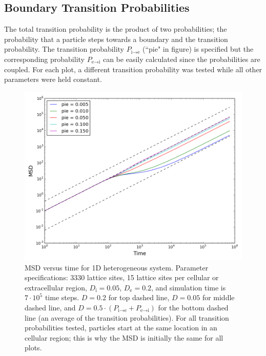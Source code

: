 \subsection{Boundary Transition Probabilities}
\label{sec:1D-boundary-transition-probabilities}
	The total transition probability is the product of two probabilities; the probability that a particle steps towards a boundary and the transition probability. The transition probability $ P_{\textrm{i} \rightarrow \textrm{e}} $ (``pie" in figure) is specified but the corresponding probability  $ P_{\textrm{e} \rightarrow \textrm{i}} $ can be easily calculated since the probabilities are coupled. For each plot, a different transition probability was tested while all other parameters were held constant.
	
	\begin{figure}[h!]
		\centering
		\includegraphics[width=1.0\linewidth]{../images/1D/pie_msd_1D}
		\caption[1D: MSD for varying boundary transition probabilities]{MSD versus time for 1D heterogeneous system. Parameter specifications: 3330 lattice sites, 15 lattice sites per cellular or extracellular region, $ D_\textrm{i} = 0.05 $, $ D_\textrm{e} = 0.2 $, and simulation time is $ 7\cdot 10^5 $ time steps. $ D = 0.2 $ for top dashed line, $ D = 0.05 $ for middle dashed line, and $ D = 0.5 \cdot (P_{\textrm{i} \rightarrow \textrm{e}} + P_{\textrm{e} \rightarrow \textrm{i}}) $ for the bottom dashed line (an average of the transition probabilities). For all transition probabilities tested, particles start at the same location in an cellular region; this is why the MSD is initially the same for all plots.}
		\label{fig:pie_msd_1D}
	\end{figure}
	
